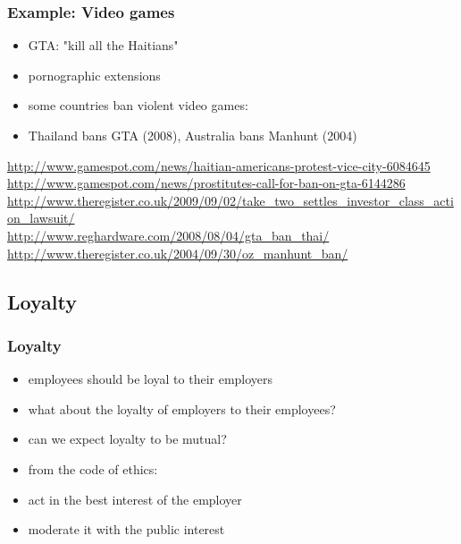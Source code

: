 \documentclass[dvipsnames]{beamer}
\theoremstyle{plain}
\begin{document}
\begin{frame}
  \frametitle{Example: Video games}

  \begin{itemize}
    \item GTA: "kill all the Haitians"
    \item pornographic extensions

    \bigskip
    \item some countries ban violent video games:
    \item Thailand bans GTA (2008), Australia bans Manhunt (2004)
  \end{itemize}

  \medskip
  \tiny{\url{http://www.gamespot.com/news/haitian-americans-protest-vice-city-6084645}}\\
  \tiny{\url{http://www.gamespot.com/news/prostitutes-call-for-ban-on-gta-6144286}}\\
  \tiny{\url{http://www.theregister.co.uk/2009/09/02/take_two_settles_investor_class_action_lawsuit/}}\\
  \tiny{\url{http://www.reghardware.com/2008/08/04/gta_ban_thai/}}\\
  \tiny{\url{http://www.theregister.co.uk/2004/09/30/oz_manhunt_ban/}}\\
\end{frame}

\subsection{Loyalty}

\begin{frame}
  \frametitle{Loyalty}

  \begin{itemize}
    \item employees should be loyal to their employers

    \medskip
    \item what about the loyalty of employers to their employees?
    \item can we expect loyalty to be mutual?

    \pause
    \bigskip
    \item from the code of ethics:
    \smallskip
    \item act in the best interest of the employer
    \item moderate it with the public interest
  \end{itemize}
\end{frame}
\end{document}
